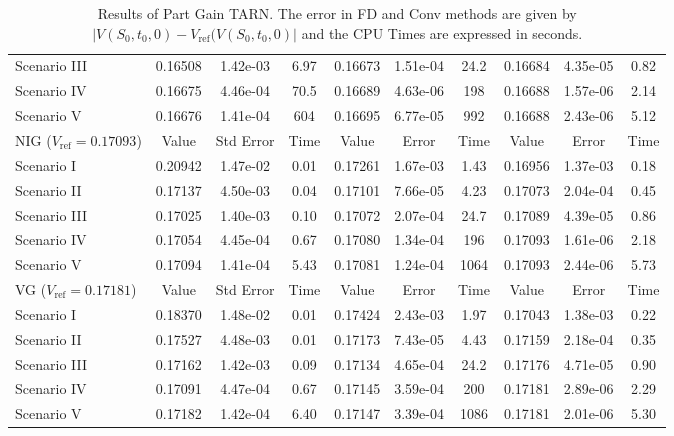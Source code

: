 \begin{table}
\begin{tabular}{l||c|c|c||c|c|c||c|c|c}
    Scenario III & 0.16508 & 1.42e-03 & 6.97 & 0.16673 & 1.51e-04 & 24.2 & 0.16684 & 4.35e-05 & 0.82 \\
    Scenario IV  & 0.16675 & 4.46e-04 & 70.5 & 0.16689 & 4.63e-06 & 198  & 0.16688 & 1.57e-06 & 2.14\\
    Scenario V   & 0.16676 & 1.41e-04 & 604  & 0.16695 & 6.77e-05 & 992  & 0.16688 & 2.43e-06 & 5.12\\
         \midrule
      NIG ($V_\text{ref}=0.17093$) & Value & Std Error  & Time & Value & Error & Time & Value & Error & Time \\
      \midrule
    Scenario I   & 0.20942 & 1.47e-02 & 0.01 & 0.17261 & 1.67e-03 & 1.43 & 0.16956 & 1.37e-03 & 0.18 \\
    Scenario II  & 0.17137 & 4.50e-03 & 0.04 & 0.17101 & 7.66e-05 & 4.23 & 0.17073 & 2.04e-04 & 0.45 \\
    Scenario III & 0.17025 & 1.40e-03 & 0.10 & 0.17072 & 2.07e-04 & 24.7 & 0.17089 & 4.39e-05 & 0.86 \\
    Scenario IV  & 0.17054 & 4.45e-04 & 0.67 & 0.17080 & 1.34e-04 & 196  & 0.17093 & 1.61e-06 & 2.18 \\
    Scenario V   & 0.17094 & 1.41e-04 & 5.43 & 0.17081 & 1.24e-04 & 1064 & 0.17093 & 2.44e-06 & 5.73 \\
         \midrule
      VG ($V_\text{ref}=0.17181$) & Value & Std Error  & Time & Value & Error & Time & Value & Error & Time \\
      \midrule
    Scenario I   & 0.18370 & 1.48e-02 & 0.01 & 0.17424 & 2.43e-03 & 1.97 & 0.17043 & 1.38e-03 & 0.22\\
    Scenario II  & 0.17527 & 4.48e-03 & 0.01 & 0.17173 & 7.43e-05 & 4.43 & 0.17159 & 2.18e-04 & 0.35\\
    Scenario III & 0.17162 & 1.42e-03 & 0.09 & 0.17134 & 4.65e-04 & 24.2 & 0.17176 & 4.71e-05 & 0.90\\
    Scenario IV  & 0.17091 & 4.47e-04 & 0.67 & 0.17145 & 3.59e-04 & 200  & 0.17181 & 2.89e-06 & 2.29\\
    Scenario V   & 0.17182 & 1.42e-04 & 6.40 & 0.17147 & 3.39e-04 & 1086 & 0.17181 & 2.01e-06 & 5.30\\
    \bottomrule
  \end{tabular}
  \vspace{5pt}
  \caption{\label{tab:res_pg} Results of Part Gain TARN. The error in FD and Conv methods are given by $|V(S_0,t_0,0)-V_\text{ref}(V(S_0,t_0,0)|$ and the CPU Times are expressed in seconds.}
\end{table}

